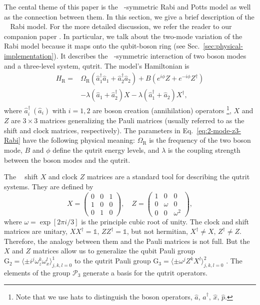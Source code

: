 \documentclass[reprint, aps, prx, amsmath, amssymb, longbibliography, superscriptaddress]{revtex4-2}
\DeclareMathOperator{\Zthree}{\mathbb{Z}_3}
\begin{document}
The cental theme of this paper is the $\Zthree$-symmetric Rabi and Potts model as well as the connection between them. In this section, we give a brief description of the $\Zthree$ Rabi model. For the more detailed discussion, we refer the reader to our companion paper \cite{lotkov_cat_}. In particular, we talk about the two-mode variation of the $\Zthree$ Rabi model because it maps onto the qubit-boson ring (see Sec.~\ref{sec:physical-implementation}). It describes the $\Zthree$-symmetric interaction of two boson modes and a three-level system, qutrit. The model's Hamiltonian is
\begin{equation}
\label{eq:2-mode-z3-Rabi}
\begin{aligned}
     H_{\text{R}} = &\Omega_{\text{R}} (\hat a_1^{\dagger} \hat a_1 + \hat a_2^{\dagger} \hat a_2) + B (e^{i\phi} Z + e^{-i\phi} Z^{\dagger}) \\
    &- \lambda (\hat a_1 + \hat a_2^{\dagger}) X - \lambda (\hat a_1^{\dagger} + \hat a_2) X^{\dagger},
\end{aligned}
\end{equation}
where $\hat a_i^{\dagger}\  (\hat a_i)$ with $i = 1,2$ are boson creation (annihilation) operators \footnote{Note that we use hats to distinguish the boson operators, $\hat a,\, \hat a^{\dagger},\, \hat x, \,\hat p$.}, $X$ and $Z$ are $3\times 3 $ matrices generalizing the Pauli matrices (usually referred to as the shift and clock matrices, respectively). The parameters in Eq.~\eqref{eq:2-mode-z3-Rabi} have the following physical meaning: $\Omega_{\text{R}}$ is the frequency of the two boson mode, $B$ and $\phi$ define the qutrit energy levels, and $\lambda$ is the coupling strength between the boson modes and the qutrit.

The $\Zthree$ shift $X$ and clock $Z$ matrices are a standard tool for describing the qutrit systems. They are defined by
\begin{equation}
\label{eq:shift-clock-matreces}
    X = \begin{pmatrix} 
         0 & 0 & 1 \\
         1 & 0 & 0 \\
         0 & 1 & 0 
        \end{pmatrix}, \quad
    Z = \begin{pmatrix}
         1 & 0 & 0 \\
         0 & \omega & 0 \\
         0 & 0 & \omega^2
        \end{pmatrix},
      \end{equation}
where $\omega = \exp[2\pi i/3]$ is the principle cubic root of unity. The clock and shift matrices are unitary, $ X X^{\dagger} = \mathbb{1}, \, Z Z^{\dagger} = \mathbb{1}$, but not hermitian, $ X^{\dagger} \neq X, \, Z^{\dagger} \neq Z$. Therefore, the analogy between them and the Pauli matrices is not full. But the $X$ and $Z$ matrices allow us to generalize the qubit Pauli group $\mathrm{G}_2 = \langle \pm i^j \omega_z^k \omega_x^l\rangle_{j,k,l = 0}^1$ to the qutrit Pauli group $\mathrm{G}_3 = \langle \pm \omega^j Z^k X^l\rangle_{j,k,l= 0}^{2}$ \cite{gottesman_faulttolerant_1999}. The elements of the group $\mathcal{P}_3$ generate a basis for the qutrit operators.
\end{document}
